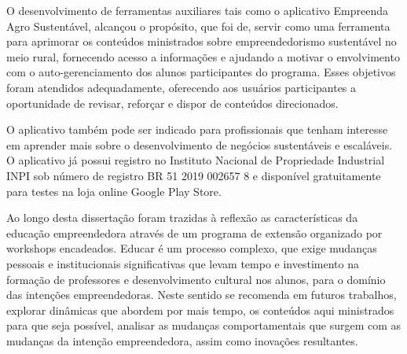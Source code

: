 O desenvolvimento de ferramentas auxiliares tais como o aplicativo Empreenda Agro Sustentável, alcançou o propósito, que foi de, servir como uma ferramenta para aprimorar os conteúdos ministrados sobre empreendedorismo sustentável no meio rural, fornecendo acesso a informações e ajudando a motivar o envolvimento com o auto-gerenciamento dos alunos participantes do programa. Esses objetivos foram atendidos adequadamente, oferecendo aos usuários participantes a oportunidade de revisar, reforçar e dispor de conteúdos direcionados. 

O aplicativo também pode ser indicado para profissionais que tenham interesse em aprender mais sobre o desenvolvimento de negócios sustentáveis e escaláveis. O aplicativo já possui registro no Instituto Nacional de Propriedade Industrial INPI sob número de registro BR 51 2019 002657 8 e disponível gratuitamente para testes na loja online Google Play Store.


Ao longo desta dissertação foram trazidas à reflexão as características da educação empreendedora através de um programa de extensão organizado por workshops encadeados. Educar é um processo complexo, que exige mudanças pessoais e institucionais  significativas que levam tempo e investimento na formação de professores e desenvolvimento cultural nos alunos, para o domínio das intenções empreendedoras. Neste sentido se recomenda em futuros trabalhos, explorar dinâmicas que abordem por mais tempo, os conteúdos aqui ministrados para que seja possível, analisar as mudanças comportamentais que surgem com as mudanças da intenção empreendedora, assim como inovações resultantes.
